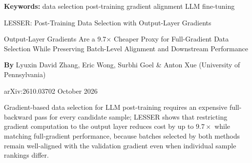 \documentclass[10pt,twocolumn]{article}
\begin{document}
\setlength{\parindent}{0pt}
\setlength{\parskip}{4pt}

{\small\color{keywordgray}\textbf{Keywords:}
  data selection \textbullet{}
  post-training \textbullet{}
  gradient alignment \textbullet{}
  LLM fine-tuning}\par\vspace{4pt}

{\LARGE\bfseries\raggedright
  LESSER: Post-Training Data Selection with Output-Layer Gradients}\par\vspace{4pt}

{\large\itshape\raggedright
  Output-Layer Gradients Are a 9.7$\times$ Cheaper Proxy for Full-Gradient Data
  Selection While Preserving Batch-Level Alignment and Downstream Performance}\par\vspace{6pt}

{\small\textbf{By} Lyuxin David Zhang, Eric Wong, Surbhi Goel \& Anton Xue
  (University of Pennsylvania)}\par\vspace{2pt}

{\small\color{keywordgray}arXiv:2610.03702 \textbullet{} October 2026}
\par\vspace{2pt}\noindent{\color{rulered}\rule{\columnwidth}{0.6pt}}\vspace{6pt}

Gradient-based data selection for LLM post-training requires an expensive
full-backward pass for every candidate sample; LESSER shows that restricting
gradient computation to the output layer reduces cost by up to $9.7\times$
while matching full-gradient performance, because batches selected by both
methods remain well-aligned with the validation gradient even when
individual sample rankings differ.
\end{document}
